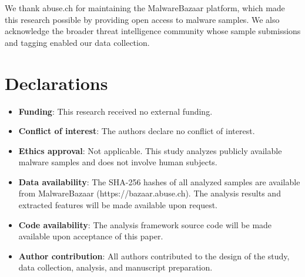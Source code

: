 \documentclass[pdflatex,sn-mathphys-num]{sn-jnl}
\theoremstyle{thmstyleone}%
\theoremstyle{thmstyletwo}%
\theoremstyle{thmstylethree}%
\begin{document}
\backmatter


We thank abuse.ch for maintaining the MalwareBazaar platform, which made this research possible by providing open access to malware samples. We also acknowledge the broader threat intelligence community whose sample submissions and tagging enabled our data collection.

\section*{Declarations}

\begin{itemize}
\item \textbf{Funding}: This research received no external funding.
\item \textbf{Conflict of interest}: The authors declare no conflict of interest.
\item \textbf{Ethics approval}: Not applicable. This study analyzes publicly available malware samples and does not involve human subjects.
\item \textbf{Data availability}: The SHA-256 hashes of all analyzed samples are available from MalwareBazaar (https://bazaar.abuse.ch). The analysis results and extracted features will be made available upon request.
\item \textbf{Code availability}: The analysis framework source code will be made available upon acceptance of this paper.
\item \textbf{Author contribution}: All authors contributed to the design of the study, data collection, analysis, and manuscript preparation.
\end{itemize}
\end{document}
